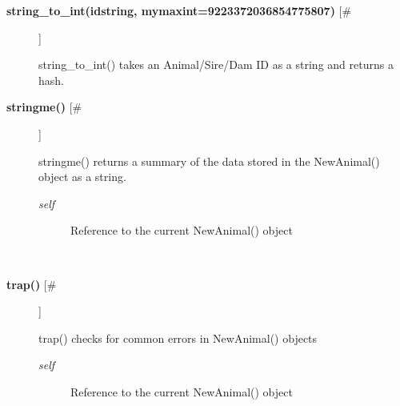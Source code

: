 \documentclass{article}
\begin{document}
\begin{description}
\item[\textbf{string\_to\_int(idstring, mymaxint=9223372036854775807)} [\#]
]
\par string\_to\_int() takes an Animal/Sire/Dam ID as a string and returns a
hash.

\item[\textbf{stringme()} [\#]
]
\par stringme() returns a summary of the data stored in the NewAnimal() object
as a string.
\begin{description}
\item[\textit{self}
]
Reference to the current NewAnimal() object
\end{description}\\

\item[\textbf{trap()} [\#]
]
\par trap() checks for common errors in NewAnimal() objects
\begin{description}
\item[\textit{self}
]
Reference to the current NewAnimal() object
\end{description}\\

\end{description}
\end{document}
